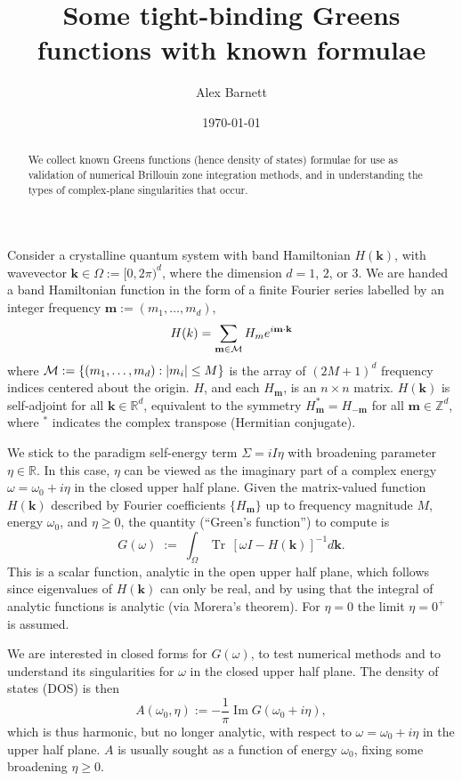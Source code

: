 \documentclass[11pt]{article}
\newcommand{\be}{\begin{equation}}
\newcommand{\ee}{\end{equation}}
\newcommand{\mbf}[1]{{\mathbf #1}}
\newcommand{\R}{\mathbb{R}}
\newcommand{\Z}{\mathbb{Z}}
\DeclareMathOperator{\im}{Im}
\DeclareMathOperator{\tr}{Tr}
\newcommand{\om}{\omega}
\newcommand{\BZ}{\Omega}
\newcommand{\kk}{\mbf{k}}
\newcommand{\mm}{\mbf{m}}
\begin{document}
\title{Some tight-binding Greens functions with known formulae}
\author{Alex Barnett}
\date{\today}
\maketitle
\begin{abstract}
  We collect known Greens functions (hence density of states)
  formulae for use as validation
  of numerical Brillouin zone integration methods, and in understanding
  the types of complex-plane singularities that occur.
\end{abstract}

Consider a crystalline quantum system with band Hamiltonian $H(\kk)$,
with wavevector $\kk\in \BZ := [0,2\pi)^d$, where the dimension $d=1$, $2$, or $3$.
We are handed a band Hamiltonian function in the form of a finite Fourier
series labelled by an integer frequency $\mm := (m_1,\dots,m_d)$,
\be
H(k) = \sum_{\mm\in{\cal M}} H_m e^{i\mm\cdot \kk}
\label{Hk}
\ee
where ${\cal M} := \{(m_1,\dots,m_d): |m_i|\le M\}$ is the array of 
$(2M+1)^d$ frequency indices centered about the origin.
$H$, and each $H_\mm$, is an $n\times n$ matrix.
$H(\kk)$ is self-adjoint for all $\kk\in\R^d$,
equivalent to the symmetry $H_\mm^* = H_{-\mm}$ for all $\mm\in\Z^d$, where
$^*$ indicates the complex transpose (Hermitian conjugate).

We stick to the paradigm self-energy term $\Sigma = iI\eta$
with broadening parameter $\eta\in\R$.
In this case, $\eta$ can be viewed as the imaginary part of
a complex energy $\om = \om_0 + i\eta$ in the closed upper half plane.
Given the matrix-valued function $H(\kk)$
described by Fourier coefficients $\{H_\mm\}$ up to frequency magnitude $M$,
energy $\om_0$, and $\eta\ge0$,
the quantity (``Green's function'') to compute is
\be
G(\om) \;:=\;
\int_\BZ \tr\, [\om I - H(\kk)]^{-1} d\kk.
\label{G}
\ee
This is a scalar function, analytic in the open upper half plane,
which follows since eigenvalues of $H(\kk)$ can only be real, and by
using that the integral of analytic functions is analytic (via Morera's theorem).
For $\eta=0$ the limit $\eta=0^+$ is assumed.

We are interested in closed forms for $G(\om)$, to
test numerical methods and to understand
its singularities for $\om$ in the closed upper half plane.
The density of states (DOS) is then
\be
A(\om_0,\eta) := -\frac{1}{\pi}\im G(\om_0+i\eta),
\label{DOS}
\ee
which is thus harmonic, but no longer analytic, with respect to $\om=\om_0+i\eta$ in the upper half plane.
$A$ is usually sought as a function of energy $\om_0$,
fixing some broadening $\eta\ge0$.
\end{document}
